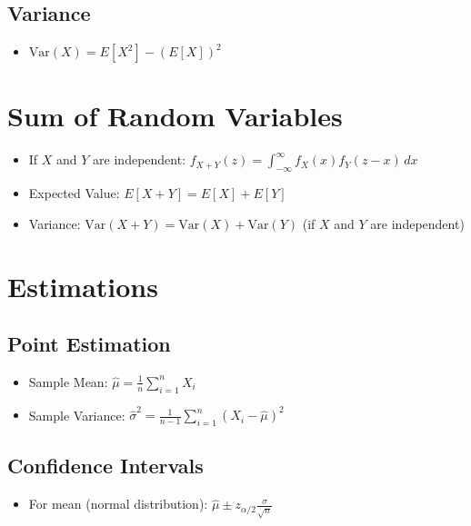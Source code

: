\documentclass{article}
\begin{document}
\subsection{Variance}
\begin{itemize}
    \item \( \text{Var}(X) = E[X^2] - (E[X])^2 \)
\end{itemize}

\section{Sum of Random Variables}
\begin{itemize}
    \item If \( X \) and \( Y \) are independent: \( f_{X+Y}(z) = \int_{-\infty}^{\infty} f_X(x) f_Y(z-x) \, dx \)
    \item Expected Value: \( E[X + Y] = E[X] + E[Y] \)
    \item Variance: \( \text{Var}(X + Y) = \text{Var}(X) + \text{Var}(Y) \) (if \( X \) and \( Y \) are independent)
\end{itemize}

\section{Estimations}
\subsection{Point Estimation}
\begin{itemize}
    \item Sample Mean: \( \hat{\mu} = \frac{1}{n} \sum_{i=1}^n X_i \)
    \item Sample Variance: \( \hat{\sigma}^2 = \frac{1}{n-1} \sum_{i=1}^n (X_i - \hat{\mu})^2 \)
\end{itemize}

\subsection{Confidence Intervals}
\begin{itemize}
    \item For mean (normal distribution): \( \hat{\mu} \pm z_{\alpha/2} \frac{\sigma}{\sqrt{n}} \)
\end{itemize}
\end{document}
